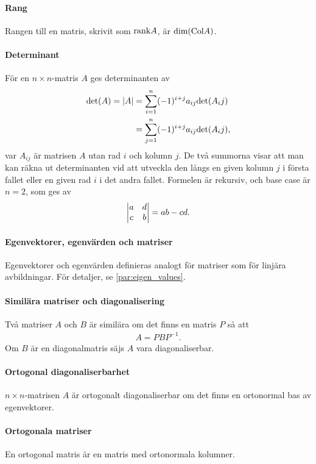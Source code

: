 \paragraph{Rang}
Rangen till en matris, skrivit som $\text{rank} A$, är $\text{dim}(\text{Col} A)$.

\paragraph{Determinant}
För en $n\times n$-matris $A$ ges determinanten av
\begin{align*}
	\text{det}(A) = \abs{A} &= \sum\limits_{i = 1}^{n}(-1)^{i + j}a_{ij}\text{det}(A_ij) \\
	&= \sum\limits_{j = 1}^{n}(-1)^{i + j}a_{ij}\text{det}(A_ij),
\end{align*}
var $A_{ij}$ är matrisen $A$ utan rad $i$ och kolumn $j$. De två summorna visar att man kan räkna ut determinanten vid att utveckla den långs en given kolumn $j$ i första fallet eller en given rad $i$ i det andra fallet. Formelen är rekursiv, och base case är $n=2$, som ges av
\begin{align*}
	\mdet{a & d \\ c & b} = ab - cd.
\end{align*}

\paragraph{Egenvektorer, egenvärden och matriser}
Egenvektorer och egenvärden definieras analogt för matriser som för linjära avbildningar. För detaljer, se \ref{par:eigen_values}.

\paragraph{Similära matriser och diagonalisering}
Två matriser $A$ och $B$ är similära om det finns en matris $P$ så att
\begin{align*}
	A = PBP^{-1}.
\end{align*}
Om $B$ är en diagonalmatris säjs $A$ vara diagonaliserbar.

\paragraph{Ortogonal diagonaliserbarhet}
$n\times n$-matrisen $A$ är ortogonalt diagonaliserbar om det finns en ortonormal bas av egenvektorer.

\paragraph{Ortogonala matriser}
En ortogonal matris är en matris med ortonormala kolumner.

